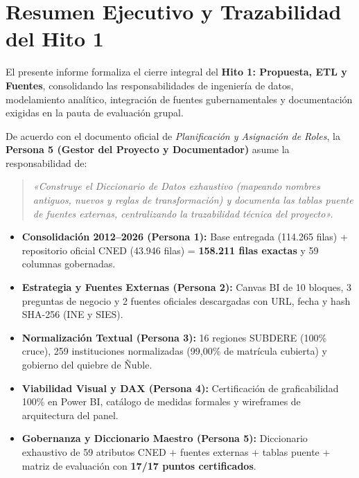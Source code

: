 \documentclass[11pt,a4paper]{article}
\begin{document}
\tableofcontents
\newpage

\section{Resumen Ejecutivo y Trazabilidad del Hito 1}
El presente informe formaliza el cierre integral del \textbf{Hito 1: Propuesta, ETL y Fuentes}, consolidando las responsabilidades de ingeniería de datos, modelamiento analítico, integración de fuentes gubernamentales y documentación exigidas en la pauta de evaluación grupal.

De acuerdo con el documento oficial de \textit{Planificación y Asignación de Roles}, la \textbf{Persona 5 (Gestor del Proyecto y Documentador)} asume la responsabilidad de:
\begin{quote}
\textit{«Construye el Diccionario de Datos exhaustivo (mapeando nombres antiguos, nuevos y reglas de transformación) y documenta las tablas puente de fuentes externas, centralizando la trazabilidad técnica del proyecto».}
\end{quote}

\begin{tcolorbox}[colback=white, colframe=primaryblue, title=\textbf{Cuadro de Consolidación Multidisciplinaria del Hito 1}]
\begin{itemize}
    \item \textbf{Consolidación 2012--2026 (Persona 1):} Base entregada (114.265 filas) + repositorio oficial CNED (43.946 filas) = \textbf{158.211 filas exactas} y 59 columnas gobernadas.
    \item \textbf{Estrategia y Fuentes Externas (Persona 2):} Canvas BI de 10 bloques, 3 preguntas de negocio y 2 fuentes oficiales descargadas con URL, fecha y hash SHA-256 (INE y SIES).
    \item \textbf{Normalización Textual (Persona 3):} 16 regiones SUBDERE (100\% cruce), 259 instituciones normalizadas (99,00\% de matrícula cubierta) y gobierno del quiebre de Ñuble.
    \item \textbf{Viabilidad Visual y DAX (Persona 4):} Certificación de graficabilidad 100\% en Power BI, catálogo de medidas formales y wireframes de arquitectura del panel.
    \item \textbf{Gobernanza y Diccionario Maestro (Persona 5):} Diccionario exhaustivo de 59 atributos CNED + fuentes externas + tablas puente + matriz de evaluación con \textbf{17/17 puntos certificados}.
\end{itemize}
\end{tcolorbox}
\end{document}
